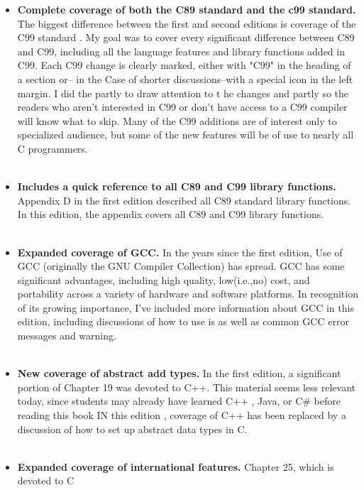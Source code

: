 \documentclass{article}
\begin{document}
 \begin{itemize}
     \item \textbf{Complete coverage of both the C89 standard and the c99 standard. } The biggest difference between the first and second editions is coverage of the C99 standard
 . My goal was to cover every significant difference between C89 and C99, including all the language features and library functions added in C99. Each C99 change is clearly marked, either with "C99" in the heading of a section or-- in the Case of shorter discussions--with a special icon in the left margin. I did the partly to draw attention to t
 he changes and partly so the readers who aren't interested in C99 or don't have access to a C99 compiler will know what to skip. Many of the C99 additions are of interest only to specialized audience, but some of the new features will be of use to nearly all C programmers.
 \\
 \\
     \item\textbf{ Includes a quick reference to all C89 and C99 library functions.} Appendix D in the first edition described all C89 standard library functions. In this edition, the appendix covers all C89 and C99 library functions. 
     \\
     \\
     \item\textbf{Expanded coverage of GCC.} In the years since the first edition, Use of GCC (originally the GNU Compiler Collection) has spread. GCC has some significant advantages, including high quality, low(i.e.,no) cost, and portability across a variety of hardware and software platforms. In recognition of its growing importance, I've included more information about GCC in this edition, including discussions of how to use is as well as common GCC error messages and warning.
     \\
     \\
     \item\textbf{New coverage of abstract add types.} In the first edition, a significant portion of Chapter 19 was devoted to C++. This material seems less relevant today, since students may already have learned C++ , Java, or C# before reading this book IN this edition , coverage of 
     C++ has been replaced by a discussion of how to set up abstract data types in C.
     \\
     \\
     \item\textbf{Expanded coverage of international features.} Chapter 25, which is devoted to C

\end{itemize}
\end{document}
